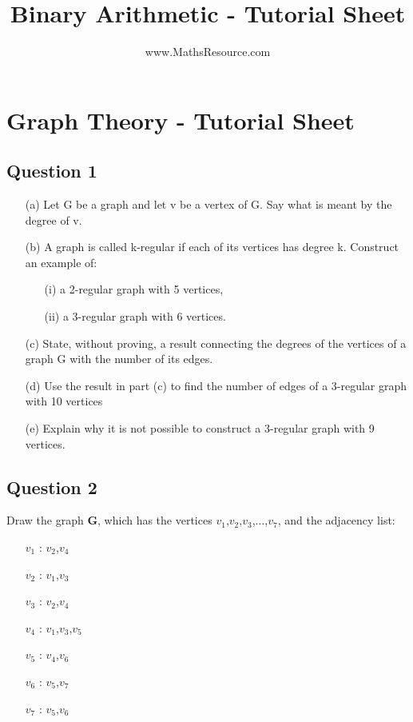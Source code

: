 \documentclass[]{article}
\title{Binary Arithmetic - Tutorial Sheet}
\author{www.MathsResource.com}
\begin{document}
\section*{Graph Theory - Tutorial Sheet}
\subsection*{Question 1}
\begin{itemize}
\item[(a)] Let G be a graph and let v be a vertex of G. Say what is meant by the degree
of v. %
\item[(b)] A graph is called k-regular if each of its vertices has degree k. Construct an
example of:
\begin{itemize}
\item[(i)] a 2-regular graph with 5 vertices, %
\item[(ii)] a 3-regular graph with 6 vertices. %
\end{itemize}
\item[(c)] State, without proving, a result connecting the degrees of the vertices of
a graph G with the number of its edges. %
\item[(d)] Use the result in part (c) to find the number of edges of a 3-regular graph with 10
vertices %
\item[(e)] Explain why it is not possible to construct a 3-regular graph with 9 vertices. %

\end{itemize}


\subsection*{Question 2}


Draw the graph \textbf{G}, which has the vertices $v_1$,$v_2$,$v_3$,$\ldots$,$v_7$, and the adjacency list:

\begin{itemize}
\item[$v_1$]: $v_2$,$v_4$
\item[$v_2$]: $v_1$,$v_3$
\item[$v_3$]: $v_2$,$v_4$
\item[$v_4$]: $v_1$,$v_3$,$v_5$
\item[$v_5$]: $v_4$,$v_6$
\item[$v_6$]: $v_5$,$v_7$
\item[$v_7$]: $v_5$,$v_6$
\end{itemize}
\end{document}
